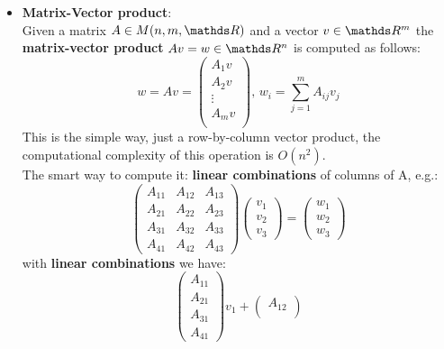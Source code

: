 \documentclass[computationalMathematics.tex]{subfiles}
\begin{document}
\begin{itemize}
     \item \textbf{Matrix-Vector product}:\\
        Given a matrix $A \in M(n, m, \R)$ and a vector $v \in \R^m$ the \textbf{matrix-vector product} $A v = w \in \R^n$ is computed as follows:
        \[
          w = Av = \begin{pmatrix}
          A_1 v\\
          A_2 v\\
          \vdots\\
          A_m v\\
          \end{pmatrix}, \, 
          w_i = \sum\limits_{j=1}^m A_{ij} v_j
        \]
        This is the simple way, just a row-by-column vector product, the computational complexity of this operation is $O(n^2)$.\\
        The smart way to compute it: \textbf{linear combinations} of columns of A, e.g.:\\
        $$
            \begin{pmatrix}
                      A_{11} & A_{12} & A_{13}\\
                      A_{21} & A_{22} & A_{23}\\
                      A_{31} & A_{32} & A_{33}\\
                      A_{41} & A_{42} & A_{43}
            \end{pmatrix}
            \begin{pmatrix}
                      v_1\\
                      v_2\\
                      v_3
            \end{pmatrix} =
            \begin{pmatrix}
                      w_1\\
                      w_2\\
                      w_3
            \end{pmatrix}
        $$
        with \textbf{linear combinations} we have:
        $$
        \begin{pmatrix}
                A_{11}\\
                A_{21}\\
                A_{31}\\
                A_{41}
        \end{pmatrix}v_1 +
        \begin{pmatrix}
                A_{12}\\

\end{pmatrix}$$
\end{itemize}
\end{document}
